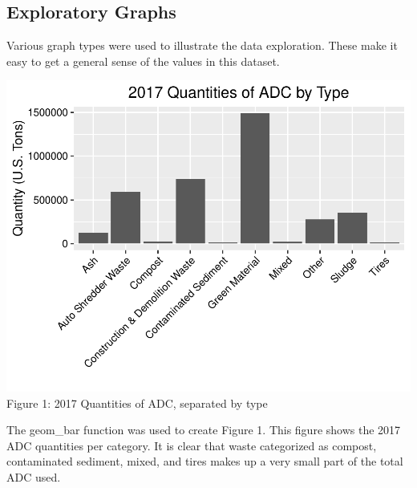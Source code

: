 \documentclass[12pt,]{article}
\begin{document}
\subsection{Exploratory Graphs}\label{exploratory-graphs}

Various graph types were used to illustrate the data exploration. These
make it easy to get a general sense of the values in this dataset.

\includegraphics{SKo_Project_Template_files/figure-latex/explore_graphs2-1.pdf}
Figure 1: 2017 Quantities of ADC, separated by type

The geom\_bar function was used to create Figure 1. This figure shows
the 2017 ADC quantities per category. It is clear that waste categorized
as compost, contaminated sediment, mixed, and tires makes up a very
small part of the total ADC used.
\end{document}
